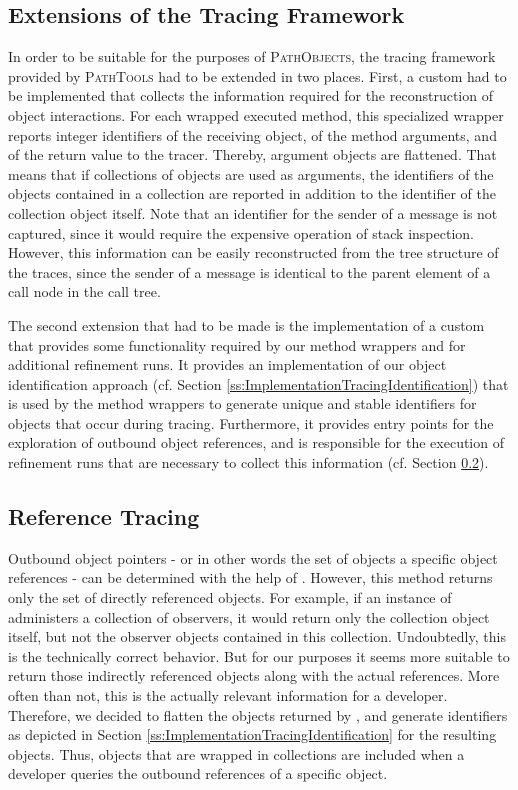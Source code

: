 \subsection{Extensions of the Tracing Framework}
\label{ss:ImplementationTracing}
In order to be suitable for the purposes of \textsc{PathObjects}, the tracing framework provided by \textsc{PathTools} had to be extended in two places.
First, a custom  had to be implemented that collects the information required for the reconstruction of object interactions.
For each wrapped executed method, this specialized wrapper reports integer identifiers of the receiving object, of the method arguments, and of the return value to the tracer.
Thereby, argument objects are flattened.
That means that if collections of objects are used as arguments, the identifiers of the objects contained in a collection are reported in addition to the identifier of the collection object itself.
Note that an identifier for the sender of a message is not captured, since it would require the expensive operation of stack inspection.
However, this information can be easily reconstructed from the tree structure of the traces, since the sender of a message is identical to the parent element of a call node in the call tree.

The second extension that had to be made is the implementation of a custom  that provides some functionality required by our method wrappers and for additional refinement runs.
It provides an implementation of our object identification approach (cf. Section \ref{ss:ImplementationTracingIdentification}) that is used by the method wrappers to generate unique and stable identifiers for objects that occur during tracing.
Furthermore, it provides entry points for the exploration of outbound object references, and is responsible for the execution of refinement runs that are necessary to collect this information (cf. Section \ref{ss:ImplementationTracingReferences}).

\subsection{Reference Tracing}
\label{ss:ImplementationTracingReferences}
Outbound object pointers - or in other words the set of objects a specific object references - can be determined with the help of  .
However, this method returns only the set of directly referenced objects.
For example, if an instance of  administers a collection of observers, it would return only the collection object itself, but not the observer objects contained in this collection.
Undoubtedly, this is the technically correct behavior.
But for our purposes it seems more suitable to return those indirectly referenced objects along with the actual references. 
More often than not, this is the actually relevant information for a developer.
Therefore, we decided to flatten the objects returned by , and generate identifiers as depicted in Section \ref{ss:ImplementationTracingIdentification} for the resulting objects.
Thus, objects that are wrapped in collections are included when a developer queries the outbound references of a specific object.

